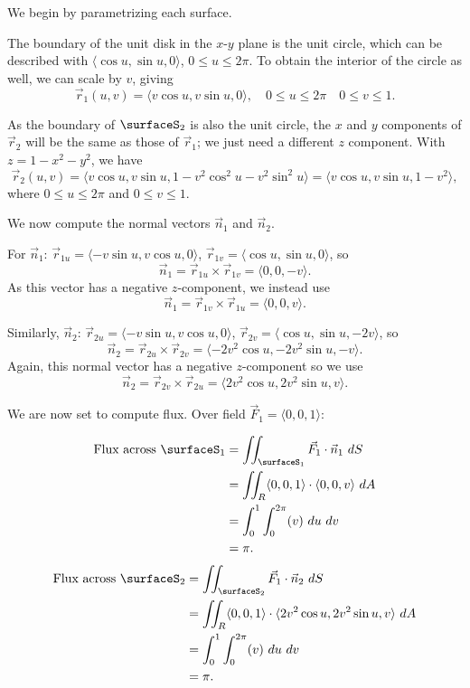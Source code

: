 {We begin by parametrizing each surface.

The boundary of the unit disk in the $x$-$y$ plane is the unit circle, which can be described with $\langle \cos u,\sin u,0\rangle$, $0\leq u\leq 2\pi$. To obtain the interior of the circle as well, we can scale by $v$, giving
\[
\vec r_1(u,v) = \langle v\cos u,v\sin u, 0\rangle, \quad 0\leq u\leq 2\pi\quad 0\leq v\leq 1.
\]

As the boundary of $\surfaceS_2$ is also the unit circle, the $x$ and $y$ components of $\vec r_2$ will be the same as those of $\vec r_1$; we just need a different $z$ component. With $z = 1-x^2-y^2$, we have
\[
\vec r_2(u,v) = \langle v\cos u,v\sin u, 1-v^2\cos^2u-v^2\sin^2u\rangle = \langle v\cos u,v\sin u, 1-v^2\rangle,
\]
where $0\leq u\leq 2\pi$ and $0\leq v\leq 1$.

We now compute the normal vectors $\vec n_1$ and $\vec n_2$.

For $\vec n_1$: $\vec r_{1u}= \langle -v\sin u, v\cos u,0\rangle$, $\vec r_{1v} = \langle \cos u,\sin u,0\rangle$, so
\[
\vec n_1 = \vec r_{1u}\times \vec r_{1v} = \langle 0,0,-v\rangle.
\]
As this vector has a negative $z$-component, we instead use
\[
\vec n_1 = \vec r_{1v}\times \vec r_{1u} = \langle 0,0,v\rangle.
\]

Similarly, $\vec n_2$: $\vec r_{2u}= \langle -v\sin u, v\cos u,0\rangle$, $\vec r_{2v} = \langle \cos u,\sin u,-2v\rangle$, so 
\[
\vec n_2 = \vec r_{2u}\times \vec r_{2v} = \langle -2v^2\cos u,-2v^2\sin u,-v\rangle.
\] 
Again, this normal vector has a negative $z$-component so we use
\[
\vec n_2 = \vec r_{2v}\times \vec r_{2u} = \langle 2v^2\cos u,2v^2\sin u,v\rangle.
\] 

We are now set to compute flux. Over field $\vec F_1=\langle 0,0,1\rangle$:

\begin{align*}
\text{Flux across $\surfaceS_1$} &= \iint_{\surfaceS_1} \vec F_1\cdot \vec n_1\ dS \\
						&= \iint_R\langle 0,0,1\rangle\cdot\langle 0,0,v\rangle\ dA\\
						&= \int_0^1\int_0^{2\pi} (v)\ du\ dv\\
						&= \pi.
\end{align*}
\drawexampleline%
\begin{align*}
\text{Flux across $\surfaceS_2$} &= \iint_{\surfaceS_2} \vec F_1\cdot \vec n_2\ dS \\
						&= \iint_R\langle 0,0,1\rangle\cdot\langle 2v^2\cos u,2v^2\sin u,v\rangle\ dA\\
						&= \int_0^1\int_0^{2\pi} (v)\ du\ dv\\
						&= \pi.
\end{align*}

}

